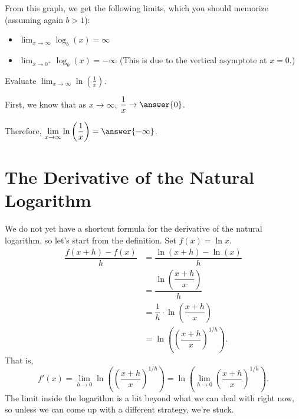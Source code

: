 \documentclass{ximera}
\begin{document}
From this graph, we get the following limits, which you should memorize (assuming again $b>1$):

\begin{itemize}
\item $\displaystyle \lim_{x\to\infty} \log_b(x) = \infty$
\item $\displaystyle \lim_{x\to0^+} \log_b(x)=-\infty$ (This is due to the vertical asymptote at $x=0$.)
\end{itemize}

\begin{question}
Evaluate $\displaystyle \lim_{x\to\infty} \ln\left(\frac{1}{x}\right)$.

First, we know that as $x \to \infty$, $\displaystyle \frac{1}{x} \to \answer{0}$.

Therefore,  $\displaystyle \lim_{x\to\infty} \ln\left(\frac{1}{x}\right) = \answer{-\infty}$.

\end{question}


\section{The Derivative of the Natural Logarithm}


We do not yet have a shortcut formula for the derivative of the natural logarithm, so let's start
from the definition.  Set $f(x) = \ln x$.
\begin{align*}
	\dfrac{f(x+h) - f(x)}{h} &= \dfrac{\ln(x+h) - \ln(x)}{h} \\
		&= \dfrac{ \ln \left( \dfrac{x+h}{x} \right) }{h} \\
		&= \dfrac{1}{h} \cdot \ln \left( \dfrac{x+h}{x} \right) \\
		&= \ln \left( \left( \dfrac{x+h}{x} \right)^{1/h} \right).
\end{align*}
That is, 
\[ f'(x) = \lim_{h \to 0} \ln \left( \left( \dfrac{x+h}{x} \right)^{1/h} \right) = \ln \left( \lim_{h \to 0} \left( \dfrac{x+h}{x} \right)^{1/h} \right).\]
The limit inside the logarithm is a bit beyond what we can deal with right now, so unless we can come up with a different strategy, we're stuck.
\end{document}
